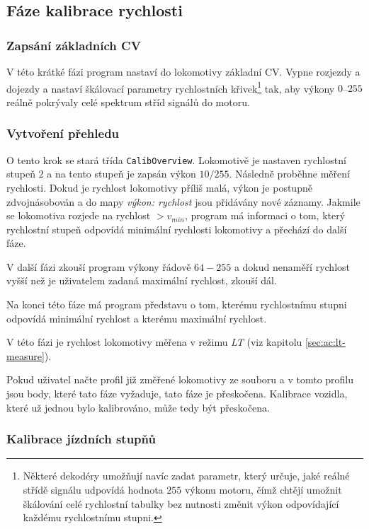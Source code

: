 \subsection{Fáze kalibrace rychlosti}

\subsubsection{Zapsání základních CV}

V této krátké fázi program nastaví do lokomotivy základní CV. Vypne rozjezdy a
dojezdy a nastaví škálovací parametry rychlostních křivek\footnote{Některé
dekodéry umožňují navíc zadat parametr, který určuje, jaké reálné střídě
signálu udpovídá hodnota $255$ výkonu motoru, čímž chtějí umožnit
škálování celé rychlostní tabulky bez nutnosti změnit výkon odpovídající
každému rychlostnímu stupni.} tak, aby výkony $0$--$255$ reálně pokrývaly celé
spektrum stříd signálů do motoru.

\subsubsection{Vytvoření přehledu}

O tento krok se stará třída \texttt{CalibOverview}.
Lokomotivě je nastaven rychlostní stupeň $2$ a na tento stupeň je zapsán výkon
$10/255$. Následně proběhne měření rychlosti. Dokud je rychlost lokomotivy
příliš malá, výkon je postupně zdvojnásobován a do mapy \textit{výkon:
rychlost} jsou přidávány nové záznamy. Jakmile se lokomotiva rozjede na
rychlost $> v_{min}$, program má informaci o tom, který rychlostní stupeň
odpovídá minimální rychlosti lokomotivy a přechází do další fáze.

V další fázi zkouší program výkony řádově $64-255$ a dokud nenaměří rychlost
vyšší než je uživatelem zadaná maximální rychlost, zkouší dál.

Na konci této fáze má program představu o tom, kterému rychlostnímu stupni
odpovídá minimální rychlost a kterému maximální rychlost.

V této fázi je rychlost lokomotivy měřena v režimu \textit{LT} (viz kapitolu
\ref{sec:ac:lt-measure}).

Pokud uživatel načte profil již změřené lokomotivy ze souboru a v tomto profilu
jsou body, které tato fáze vyžaduje, tato fáze je přeskočena. Kalibrace vozidla,
které už jednou bylo kalibrováno, může tedy být přeskočena.

\subsubsection{Kalibrace jízdních stupňů}

